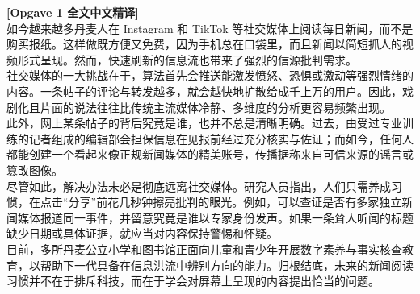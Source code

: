 \begin{transbox}
\small
\textbf{\color{NCDTeal}[Opgave 1 全文中文精译]}\\
如今越来越多丹麦人在 Instagram 和 TikTok 等社交媒体上阅读每日新闻，而不是购买报纸。这样做既方便又免费，因为手机总在口袋里，而且新闻以简短抓人的视频形式呈现。然而，快速刷新的信息流也带来了强烈的信源批判需求。\\[3pt]
社交媒体的一大挑战在于，算法首先会推送能激发愤怒、恐惧或激动等强烈情绪的内容。一条帖子的评论与转发越多，就会越快地扩散给成千上万的用户。因此，戏剧化且片面的说法往往比传统主流媒体冷静、多维度的分析更容易频繁出现。\\[3pt]
此外，网上某条帖子的背后究竟是谁，也并不总是清晰明确。过去，由受过专业训练的记者组成的编辑部会担保信息在见报前经过充分核实与佐证；而如今，任何人都能创建一个看起来像正规新闻媒体的精美账号，传播据称来自可信来源的谣言或篡改图像。\\[3pt]
尽管如此，解决办法未必是彻底远离社交媒体。研究人员指出，人们只需养成习惯，在点击“分享”前花几秒钟擦亮批判的眼光。例如，可以查证是否有多家独立新闻媒体报道同一事件，并留意究竟是谁以专家身份发声。如果一条耸人听闻的标题缺少日期或具体证据，就应当对内容保持警惕和怀疑。\\[3pt]
目前，多所丹麦公立小学和图书馆正面向儿童和青少年开展数字素养与事实核查教育，以帮助下一代具备在信息洪流中辨别方向的能力。归根结底，未来的新闻阅读习惯并不在于排斥科技，而在于学会对屏幕上呈现的内容提出恰当的问题。
\end{transbox}

